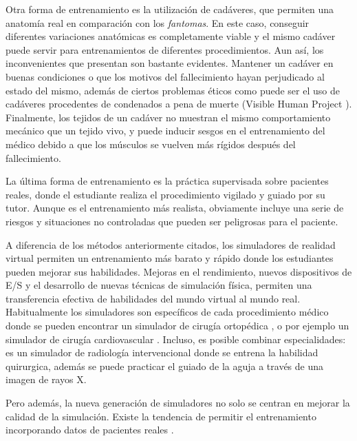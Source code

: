 Otra forma de entrenamiento es la utilización de cadáveres\cite{Tsui2007}, que permiten una anatomía real en comparación con los \emph{fantomas}. En este caso, conseguir diferentes variaciones anatómicas es completamente viable y el mismo cadáver puede servir para entrenamientos de diferentes procedimientos. Aun así, los inconvenientes que presentan son bastante evidentes. Mantener un cadáver en buenas condiciones o que los motivos del fallecimiento hayan perjudicado al estado del mismo, además de ciertos problemas éticos como puede ser el uso de cadáveres procedentes de condenados a pena de muerte (Visible Human Project \cite{ackerman1998visible}). Finalmente, los tejidos de un cadáver no muestran el mismo comportamiento mecánico que un tejido vivo, y puede inducir sesgos en el entrenamiento del médico debido a que los músculos se vuelven más rígidos después del fallecimiento.


La última forma de entrenamiento es la práctica supervisada sobre pacientes reales, donde el estudiante realiza el procedimiento vigilado y guiado por su tutor. Aunque es el entrenamiento más realista, obviamente incluye una serie de riesgos y situaciones no controladas que pueden ser peligrosas para el paciente.


A diferencia de los métodos anteriormente citados, los simuladores de realidad virtual permiten un entrenamiento más barato y rápido donde los estudiantes pueden mejorar sus habilidades. Mejoras en el rendimiento, nuevos dispositivos de \ac{E/S} y el desarrollo de nuevas técnicas de simulación física, permiten una transferencia efectiva de habilidades del mundo virtual al mundo real. Habitualmente los simuladores  son específicos de cada procedimiento médico donde se pueden encontrar un simulador de cirugía ortopédica \cite{cecil2017advanced}, o por ejemplo un simulador de cirugía cardiovascular \cite{korzeniowski2018vcsim3}. Incluso, es posible combinar especialidades: \cite{villard2014interventional} es un simulador de radiología intervencional donde se entrena la habilidad quirurgica, además se puede practicar el guiado de la aguja a través de una imagen de rayos X.

Pero además, la nueva generación de simuladores no solo se centran en mejorar la calidad de la simulación. Existe la tendencia de permitir el entrenamiento incorporando datos de pacientes reales \cite{Willaert2012,  Votta2013}. 








